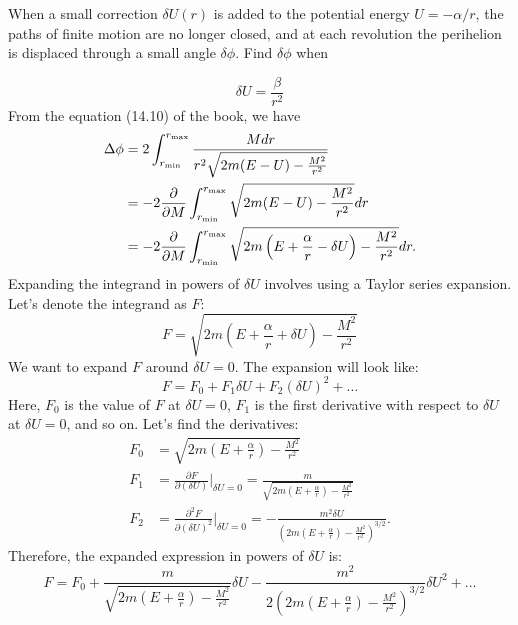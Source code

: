 \begin{problem}
{
When a small correction $\delta U(r)$ is added to the potential energy $U=-\alpha/r$, the paths of finite motion are no longer closed, and at each revolution the perihelion is displaced through a small angle $\delta\phi$. Find $\delta\phi$ when
}{}{}
\end{problem}
\begin{subproblem}
{
\begin{equation*}
    \delta U = \frac{\beta}{r^2}
\end{equation*}
}
{
From the equation (14.10) of the book, we have
\begin{align*}
    \Delta \phi &= 2\int_{r_{\text{min}}}^{r_{\text{max}}}\frac{Mdr}{r^2\sqrt{2m(E-U)-\frac{M^2}{r^2}}} \\
    &= -2\frac{\partial }{\partial M}\int_{r_{\text{min}}}^{r_{\text{max}}}\sqrt{2m(E-U)-\frac{M^2}{r^2}}dr \\
    &= -2\frac{\partial }{\partial M}\int_{r_{\text{min}}}^{r_{\text{max}}}\sqrt{2m\left(E+\frac{\alpha}{r}-\delta U\right)-\frac{M^2}{r^2}}dr.
\end{align*}
Expanding the integrand in powers of $\delta U$ involves using a Taylor series expansion. Let's denote the integrand as $F$:
\begin{equation*}
    F = \sqrt{2m\left(E+\frac{\alpha}{r}+\delta U\right)-\frac{M^2}{r^2}}
\end{equation*}
We want to expand $F$ around $\delta U = 0$. The expansion will look like:
\begin{equation*}
    F = F_0 + F_1 \delta U + F_2 (\delta U)^2 + \ldots
\end{equation*}
Here, $F_0$ is the value of $F$ at $\delta U = 0$, $F_1$ is the first derivative with respect to $\delta U$ at $\delta U = 0$, and so on. Let's find the derivatives:
\begin{align*}
    F_0 &= \sqrt{2m\left(E+\frac{\alpha}{r}\right)-\frac{M^2}{r^2}}\\
    F_1 &= \frac{\partial F}{\partial (\delta U)}\Big|_{\delta U=0} = \frac{m}{\sqrt{2m\left(E+\frac{\alpha}{r}\right)-\frac{M^2}{r^2}}} \\
    F_2 &= \frac{\partial^2 F}{\partial (\delta U)^2}\Big|_{\delta U=0} = -\frac{m^2 \delta U}{\left(2m\left(E+\frac{\alpha}{r}\right)-\frac{M^2}{r^2}\right)^{3/2}}.
\end{align*}
Therefore, the expanded expression in powers of $\delta U$ is:
\begin{equation*}
    F = F_0 + \frac{m}{\sqrt{2m\left(E+\frac{\alpha}{r}\right)-\frac{M^2}{r^2}}} \delta U - \frac{m^2}{2\left(2m\left(E+\frac{\alpha}{r}\right)-\frac{M^2}{r^2}\right)^{3/2}} \delta U^2 + \ldots

\end{equation*}}
\end{subproblem}
